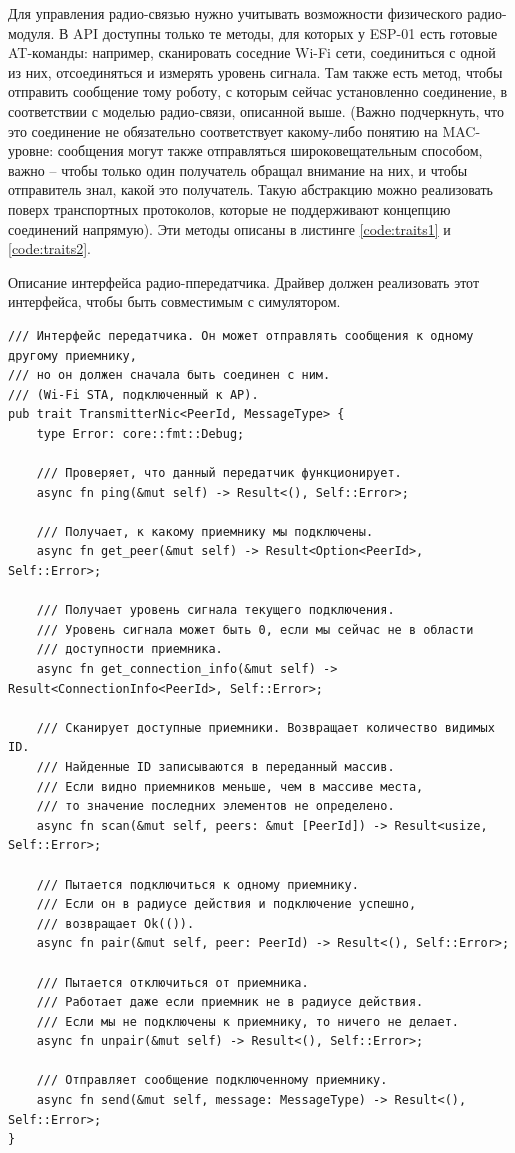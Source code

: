 \documentclass[%
]{report}
\begin{document}
Для управления радио-связью нужно учитывать возможности физического радио-модуля.
В API доступны только те методы,
для которых у ESP-01 есть готовые AT-команды:
например, сканировать соседние Wi-Fi сети,
соединиться с одной из них,
отсоединяться
и измерять уровень сигнала.
Там также есть метод, чтобы отправить сообщение тому роботу,
с которым сейчас установленно соединение,
в соответствии с моделью радио-связи, описанной выше.
(Важно подчеркнуть, что это соединение не обязательно соответствует какому-либо понятию на MAC-уровне:
сообщения могут также отправляться широковещательным способом,
важно -- чтобы только один получатель обращал внимание на них,
и чтобы отправитель знал, какой это получатель.
Такую абстракцию можно реализовать поверх транспортных протоколов,
которые не поддерживают концепцию соединений напрямую).
Эти методы описаны в листинге \ref{code:traits1} и \ref{code:traits2}.

\begin{listing}
\caption{Описание интерфейса радио-ппередатчика.
Драйвер должен реализовать этот интерфейса,
чтобы быть совместимым с симулятором.}
\label{code:traits1}
\begin{verbatim}
/// Интерфейс передатчика. Он может отправлять сообщения к одному другому приемнику,
/// но он должен сначала быть соединен с ним.
/// (Wi-Fi STA, подключенный к AP).
pub trait TransmitterNic<PeerId, MessageType> {
    type Error: core::fmt::Debug;

    /// Проверяет, что данный передатчик функционирует.
    async fn ping(&mut self) -> Result<(), Self::Error>;

    /// Получает, к какому приемнику мы подключены.
    async fn get_peer(&mut self) -> Result<Option<PeerId>, Self::Error>;

    /// Получает уровень сигнала текущего подключения.
    /// Уровень сигнала может быть 0, если мы сейчас не в области
    /// доступности приемника.
    async fn get_connection_info(&mut self) -> Result<ConnectionInfo<PeerId>, Self::Error>;

    /// Сканирует доступные приемники. Возвращает количество видимых ID.
    /// Найденные ID записываются в переданный массив.
    /// Если видно приемников меньше, чем в массиве места,
    /// то значение последних элементов не определено.
    async fn scan(&mut self, peers: &mut [PeerId]) -> Result<usize, Self::Error>;

    /// Пытается подключиться к одному приемнику.
    /// Если он в радиусе действия и подключение успешно,
    /// возвращает Ok(()).
    async fn pair(&mut self, peer: PeerId) -> Result<(), Self::Error>;

    /// Пытается отключиться от приемника.
    /// Работает даже если приемник не в радиусе действия.
    /// Если мы не подключены к приемнику, то ничего не делает.
    async fn unpair(&mut self) -> Result<(), Self::Error>;

    /// Отправляет сообщение подключенному приемнику.
    async fn send(&mut self, message: MessageType) -> Result<(), Self::Error>;
}
\end{verbatim}
\end{listing}
\end{document}
